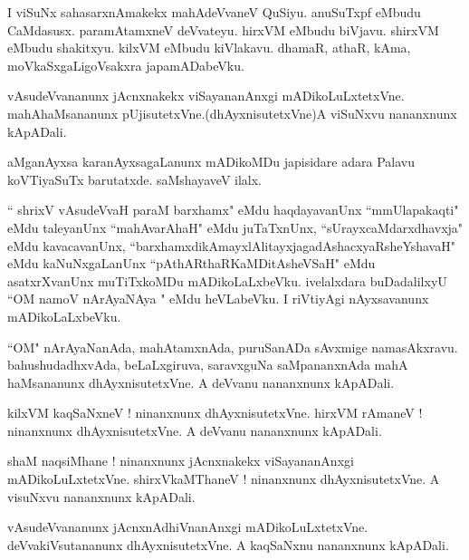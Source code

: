 \documentclass{article}
\begin{document}
\begin{mn}%
I viSuNx sahasarxnAmakekx mahAdeVvaneV QuSiyu. anuSuTxpf eMbudu CaMdasusx. paramAtamxneV deVvateyu. 
hirxVM eMbudu biVjavu. shirxVM eMbudu shakitxyu. kilxVM eMbudu kiVlakavu. dhamaR, athaR, kAma, 
moVkaSxgaLigoVsakxra japamADabeVku.
\end{mn}

\begin{mn}%
vAsudeVvananunx jAcnxnakekx viSayananAnxgi mADikoLuLxtetxVne. mahAhaMsananunx 
pUjisutetxVne.(dhAyxnisutetxVne)A viSuNxvu nananxnunx kApADali.
\end{mn}

\begin{mn}%
aMganAyxsa karanAyxsagaLanunx mADikoMDu japisidare adara Palavu koVTiyaSuTx barutatxde. saMshayaveV 
ilalx.
\end{mn}

\begin{mn}%
`` shrixV vAsudeVvaH paraM barxhamx" eMdu haqdayavanUnx ``mmUlapakaqti" eMdu taleyanUnx 
``mahAvarAhaH" eMdu juTaTxnUnx, ``sUrayxcaMdarxdhavxja" eMdu kavacavanUnx, 
``barxhamxdikAmayxlAlitayxjagadAshacxyaRsheYshavaH" eMdu kaNuNxgaLanUnx 
``pAthARthaRKaMDitAsheVSaH" eMdu asatxrXvanUnx muTiTxkoMDu mADikoLaLxbeVku. ivelalxdara 
buDadalilxyU ``OM namoV nArAyaNAya " eMdu heVLabeVku. I riVtiyAgi nAyxsavanunx mADikoLaLxbeVku.
\end{mn}

\begin{mn}%
``OM" nArAyaNanAda, mahAtamxnAda, puruSanADa sAvxmige namasAkxravu. bahushudadhxvAda, beLaLxgiruva, 
saravxguNa saMpananxnAda mahA haMsananunx dhAyxnisutetxVne. A deVvanu nananxnunx kApADali.
\end{mn}

\begin{mn}%
kilxVM kaqSaNxneV ! ninanxnunx dhAyxnisutetxVne. hirxVM rAmaneV ! ninanxnunx dhAyxnisutetxVne. A 
deVvanu nananxnunx kApADali.
\end{mn}

\begin{mn}%
shaM naqsiMhane ! ninanxnunx jAcnxnakekx viSayananAnxgi mADikoLuLxtetxVne. shirxVkaMThaneV ! 
ninanxnunx dhAyxnisutetxVne. A visuNxvu nananxnunx kApADali.
\end{mn}

\begin{mn}%
vAsudeVvananunx jAcnxnAdhiVnanAnxgi mADikoLuLxtetxVne. deVvakiVsutananunx dhAyxnisutetxVne. A 
kaqSaNxnu nananxnunx kApADali. 
\end{mn}
\end{document}
